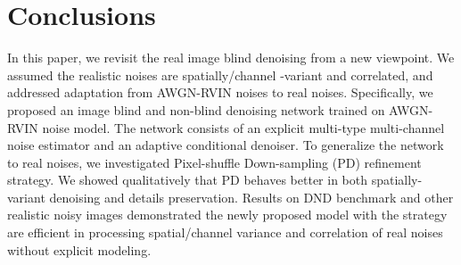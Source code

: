\documentclass[letterpaper]{article} \usepackage{aaai20}  \usepackage{times}  \usepackage{helvet} \usepackage{courier}  \usepackage{comment}
\begin{document}
 \section{Conclusions}
In this paper, we revisit the real image blind denoising from a new viewpoint. We assumed the realistic noises are spatially/channel -variant  and correlated, and addressed adaptation from AWGN-RVIN noises to real noises. Specifically, we proposed an image blind and non-blind denoising network trained on AWGN-RVIN noise model. The network consists of an explicit multi-type multi-channel noise estimator and an adaptive conditional denoiser. To generalize the network to real noises, we investigated Pixel-shuffle Down-sampling (PD) refinement strategy. We showed qualitatively that PD behaves better in both spatially-variant denoising and details preservation. Results on DND benchmark and other realistic noisy images demonstrated the newly proposed model with the strategy are efficient in processing spatial/channel variance and correlation of real noises without explicit modeling. 
 

\end{document}
